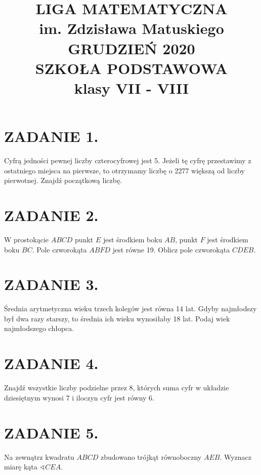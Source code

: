 \documentclass[10pt]{article}
\title{LIGA MATEMATYCZNA \\
 im. Zdzisława Matuskiego \\
 GRUDZIEŃ 2020 \\
 SZKOŁA PODSTAWOWA \\
 klasy VII - VIII }
\author{}
\date{}
\newcommand\varangle{\mathop{\sphericalangle}}
\begin{document}
\maketitle
\section*{ZADANIE 1.}
Cyfrą jedności pewnej liczby czterocyfrowej jest 5. Jeżeli tę cyfrę przestawimy z ostatniego miejsca na pierwsze, to otrzymamy liczbę o 2277 większą od liczby pierwotnej. Znajdź początkową liczbę.

\section*{ZADANIE 2.}
W prostokącie \(A B C D\) punkt \(E\) jest środkiem boku \(A B\), punkt \(F\) jest środkiem boku \(B C\). Pole czworokąta \(A B F D\) jest równe 19. Oblicz pole czworokąta \(C D E B\).

\section*{ZADANIE 3.}
Średnia arytmetyczna wieku trzech kolegów jest równa 14 lat. Gdyby najmłodszy był dwa razy starszy, to średnia ich wieku wynosiłaby 18 lat. Podaj wiek najmłodszego chłopca.

\section*{ZADANIE 4.}
Znajdź wszystkie liczby podzielne przez 8, których suma cyfr w układzie dziesiętnym wynosi 7 i iloczyn cyfr jest równy 6.

\section*{ZADANIE 5.}
Na zewnątrz kwadratu \(A B C D\) zbudowano trójkąt równoboczny \(A E B\). Wyznacz miarę kąta \(\varangle C E A\).
\end{document}
